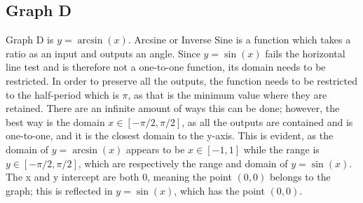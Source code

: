 \subsection{Graph D}

Graph D is ${y=\arcsin(x)}$.
Arcsine or Inverse Sine is a function which takes a ratio as an input and outputs an angle.
Since ${y=\sin(x)}$ fails the horizontal line test and is therefore not a one-to-one function, its domain needs to be restricted.
In order to preserve all the outputs, the function needs to be restricted to the half-period which is ${\pi}$, as that is the minimum value where they are retained.
There are an infinite amount of ways this can be done; however, the best way is the domain ${x \in {[{-\pi/2}, {\pi/2}]}}$, as all the outputs are contained and is one-to-one, and it is the closest domain to the y-axis.
This is evident, as the domain of ${y=\arcsin(x)}$ appears to be ${x \in {[{-1}, {1}]}}$ while the range is ${y \in {[{-\pi/2}, {\pi/2}]}}$, which are respectively the range and domain of ${y=\sin(x)}$.
The x and y intercept are both 0, meaning the point ${(0, 0)}$ belongs to the graph; this is reflected in ${y=\sin(x)}$, which has the point ${(0, 0)}$.
